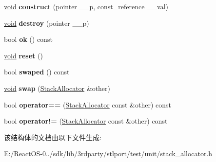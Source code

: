 \begin{DoxyCompactItemize}
\hyperlink{interfacevoid}{void} {\bfseries construct} (pointer \+\_\+\+\_\+p, const\+\_\+reference \+\_\+\+\_\+val)
\item 
\mbox{\label{struct_stack_allocator_a1e3f1ccd24dbf46c7315a2adc17c43ad}} 
\hyperlink{interfacevoid}{void} {\bfseries destroy} (pointer \+\_\+\+\_\+p)
\item 
\mbox{\label{struct_stack_allocator_ae87af94d65c8032ffe21242e152d0a04}} 
bool {\bfseries ok} () const
\item 
\mbox{\label{struct_stack_allocator_a660afbfe5f8502fbf220df77faa3e6f3}} 
\hyperlink{interfacevoid}{void} {\bfseries reset} ()
\item 
\mbox{\label{struct_stack_allocator_af1cf381361389c5ef39c2ecc32572bc2}} 
bool {\bfseries swaped} () const
\item 
\mbox{\label{struct_stack_allocator_a9bdee443605659ae6ae6ab2896654d51}} 
\hyperlink{interfacevoid}{void} {\bfseries swap} (\hyperlink{struct_stack_allocator}{Stack\+Allocator} \&other)
\item 
\mbox{\label{struct_stack_allocator_abb9deda666e75fd810f9780e4b68c7f7}} 
bool {\bfseries operator==} (\hyperlink{struct_stack_allocator}{Stack\+Allocator} const \&other) const
\item 
\mbox{\label{struct_stack_allocator_a14ebd26aa4cd04d22a935cc246d08bf2}} 
bool {\bfseries operator!=} (\hyperlink{struct_stack_allocator}{Stack\+Allocator} const \&other) const
\end{DoxyCompactItemize}


该结构体的文档由以下文件生成\+:\begin{DoxyCompactItemize}
\item 
E\+:/\+React\+O\+S-\/0../sdk/lib/3rdparty/stlport/test/unit/stack\+\_\+allocator.\+h\end{DoxyCompactItemize}
